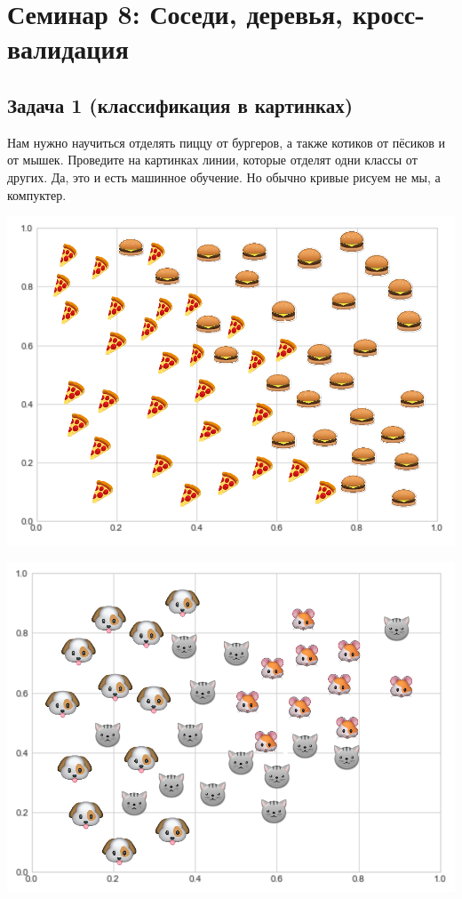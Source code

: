 \documentclass[12pt, a4paper, oneside]{article}
\begin{document}
	
\section*{Семинар 8:  Соседи, деревья, кросс-валидация}

\subsection*{Задача 1 (классификация в картинках)}

Нам нужно научиться отделять пиццу от бургеров, а также котиков от пёсиков и от мышек. Проведите на картинках линии, которые отделят одни классы от других.  Да, это и есть машинное обучение. Но обычно кривые рисуем не мы, а компуктер.

\begin{minipage}[t]{0.45\textwidth}
	\includegraphics[scale=0.21]{class_1.png}
\end{minipage}
\hfill
\begin{minipage}[t]{0.45\textwidth}
	\includegraphics[scale=0.21]{class_2.png}
\end{minipage}
\end{document}
